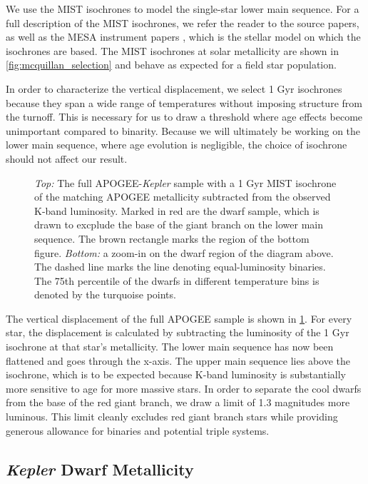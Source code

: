 \documentclass[manuscript]{aastex6}
\newcommand{\Kepler}{\mbox{\textit{Kepler}}}
\begin{document}
We use the MIST \citep{Dotter16,Choi16} isochrones to model the 
single-star lower main sequence. For a full description of the MIST 
isochrones, we refer the reader to the source papers, as well as the MESA 
instrument papers \citep{Paxton11, Paxton13, Paxton15}, which is the stellar 
model on which the isochrones are based. The MIST isochrones at solar
metallicity are shown in \cref{fig:mcquillan_selection} and behave as expected for a field
star population.

In order to characterize the vertical displacement, we select 1 Gyr isochrones 
because they span a wide range of temperatures without imposing
structure from the turnoff. This is necessary for us to draw a threshold where 
age effects become unimportant compared to binarity. Because we will 
ultimately be working on the lower main sequence, where age evolution is 
negligible, the choice of isochrone should not affect our result. 

\begin{figure}[htb]
    \centering
    \caption{\emph{Top:} The full APOGEE-\Kepler{} sample with a 1 Gyr MIST
    isochrone of the matching APOGEE metallicity subtracted from the observed
K-band luminosity. Marked in red are the dwarf sample, which is drawn to
excplude the base of the giant branch on the lower main sequence. The brown
rectangle marks the region of the bottom figure. \emph{Bottom:} a zoom-in on
the dwarf region of the diagram above. The dashed line marks the line denoting
equal-luminosity binaries. The 75th percentile of the dwarfs in different
temperature bins is denoted by the turquoise points.}\label{fig:sample_dk}
\end{figure}

The vertical displacement of the full APOGEE sample is shown in 
\cref{fig:sample_dk}. For every star, the displacement is calculated by
subtracting the luminosity of the 1 Gyr isochrone at that star's metallicity.
The lower main sequence has now been flattened and goes through the x-axis. The
upper main sequence lies above the isochrone, which is to be expected because
K-band luminosity is substantially more sensitive to age for more massive
stars. In order to separate the cool dwarfs from the base of the red giant 
branch, we draw a limit of 1.3 magnitudes more luminous. This limit
cleanly excludes red giant branch stars while providing generous allowance for
binaries and potential triple systems.

\subsection{\Kepler{} Dwarf Metallicity}
\end{document}

